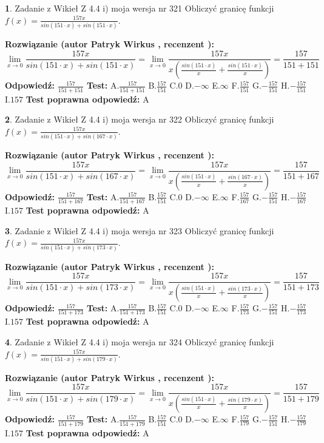 \documentclass[12pt, a4paper]{article}
\theoremstyle{definition} %
\newtheorem{zad}{}
\newcommand{\zadStart}[1]{\begin{zad}#1\newline}
\newcommand{\zadStop}{\end{zad}}
\newcommand{\rozwStart}[2]{\noindent \textbf{Rozwiązanie (autor #1 , recenzent #2): }\newline}
\newcommand{\rozwStop}{\newline}
\newcommand{\odpStart}{\noindent \textbf{Odpowiedź:}\newline}
\newcommand{\odpStop}{\newline}
\newcommand{\testStart}{\noindent \textbf{Test:}\newline}
\newcommand{\testStop}{\newline}
\newcommand{\kluczStart}{\noindent \textbf{Test poprawna odpowiedź:}\newline}
\newcommand{\kluczStop}{\newline}
\begin{document}
\zadStart{Zadanie z Wikieł Z 4.4 i) moja wersja nr 321}
Obliczyć granicę funkcji $f(x)=\frac{157x}{sin(151\cdot x) +sin(151\cdot x)}$.
\zadStop
\rozwStart{Patryk Wirkus}{}
$$\lim\limits_{x\to 0}\frac{157x}{sin(151\cdot x) +sin(151\cdot x)}=\lim\limits_{x\to 0}\frac{157x}{x(\frac{sin(151\cdot x)}{x}+\frac{sin(151\cdot x)}{x})}=\frac{157}{151+151}$$
\rozwStop
\odpStart
$\frac{157}{151+151}$
\odpStop
\testStart
A.$\frac{157}{151+151}$
B.$\frac{157}{151}$
C.$0$
D.$-\infty$
E.$\infty$
F.$\frac{157}{151}$
G.$-\frac{157}{151}$
H.$-\frac{157}{151}$
I.$157$
\testStop
\kluczStart
A
\kluczStop



\zadStart{Zadanie z Wikieł Z 4.4 i) moja wersja nr 322}
Obliczyć granicę funkcji $f(x)=\frac{157x}{sin(151\cdot x) +sin(167\cdot x)}$.
\zadStop
\rozwStart{Patryk Wirkus}{}
$$\lim\limits_{x\to 0}\frac{157x}{sin(151\cdot x) +sin(167\cdot x)}=\lim\limits_{x\to 0}\frac{157x}{x(\frac{sin(151\cdot x)}{x}+\frac{sin(167\cdot x)}{x})}=\frac{157}{151+167}$$
\rozwStop
\odpStart
$\frac{157}{151+167}$
\odpStop
\testStart
A.$\frac{157}{151+167}$
B.$\frac{157}{151}$
C.$0$
D.$-\infty$
E.$\infty$
F.$\frac{157}{167}$
G.$-\frac{157}{151}$
H.$-\frac{157}{167}$
I.$157$
\testStop
\kluczStart
A
\kluczStop



\zadStart{Zadanie z Wikieł Z 4.4 i) moja wersja nr 323}
Obliczyć granicę funkcji $f(x)=\frac{157x}{sin(151\cdot x) +sin(173\cdot x)}$.
\zadStop
\rozwStart{Patryk Wirkus}{}
$$\lim\limits_{x\to 0}\frac{157x}{sin(151\cdot x) +sin(173\cdot x)}=\lim\limits_{x\to 0}\frac{157x}{x(\frac{sin(151\cdot x)}{x}+\frac{sin(173\cdot x)}{x})}=\frac{157}{151+173}$$
\rozwStop
\odpStart
$\frac{157}{151+173}$
\odpStop
\testStart
A.$\frac{157}{151+173}$
B.$\frac{157}{151}$
C.$0$
D.$-\infty$
E.$\infty$
F.$\frac{157}{173}$
G.$-\frac{157}{151}$
H.$-\frac{157}{173}$
I.$157$
\testStop
\kluczStart
A
\kluczStop



\zadStart{Zadanie z Wikieł Z 4.4 i) moja wersja nr 324}
Obliczyć granicę funkcji $f(x)=\frac{157x}{sin(151\cdot x) +sin(179\cdot x)}$.
\zadStop
\rozwStart{Patryk Wirkus}{}
$$\lim\limits_{x\to 0}\frac{157x}{sin(151\cdot x) +sin(179\cdot x)}=\lim\limits_{x\to 0}\frac{157x}{x(\frac{sin(151\cdot x)}{x}+\frac{sin(179\cdot x)}{x})}=\frac{157}{151+179}$$
\rozwStop
\odpStart
$\frac{157}{151+179}$
\odpStop
\testStart
A.$\frac{157}{151+179}$
B.$\frac{157}{151}$
C.$0$
D.$-\infty$
E.$\infty$
F.$\frac{157}{179}$
G.$-\frac{157}{151}$
H.$-\frac{157}{179}$
I.$157$
\testStop
\kluczStart
A
\kluczStop
\end{document}
